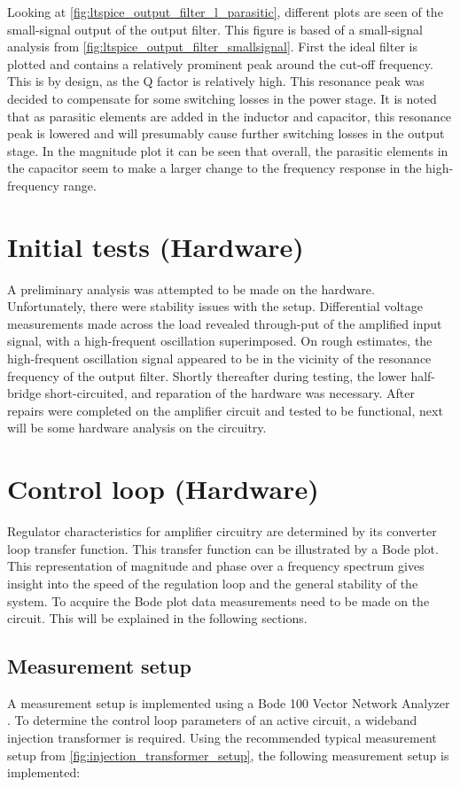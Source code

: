 Looking at \autoref{fig:ltspice_output_filter_l_parasitic}, different plots are seen of the small-signal output of the output filter. This figure is based of a small-signal analysis from \autoref{fig:ltspice_output_filter_smallsignal}. First the ideal filter is plotted and contains a relatively prominent peak around the cut-off frequency. This is by design, as the Q factor is relatively high. This resonance peak was decided to compensate for some switching losses in the power stage. It is noted that as parasitic elements are added in the inductor and capacitor, this resonance peak is lowered and will presumably cause further switching losses in the output stage. In the magnitude plot it can be seen that overall, the parasitic elements in the capacitor seem to make a larger change to the frequency response in the high-frequency range.

\section{Initial tests (Hardware)}
A preliminary analysis was attempted to be made on the hardware. Unfortunately, there were stability issues with the setup. Differential voltage measurements made across the load revealed through-put of the amplified input signal, with a high-frequent oscillation superimposed. On rough estimates, the high-frequent oscillation signal appeared to be in the vicinity of the resonance frequency of the output filter. Shortly thereafter during testing, the lower half-bridge short-circuited, and reparation of the hardware was necessary. After repairs were completed on the amplifier circuit and tested to be functional, next will be some hardware analysis on the circuitry.

\section{Control loop (Hardware)}
Regulator characteristics for amplifier circuitry are determined by its converter loop transfer function. This transfer function can be illustrated by a Bode plot. This representation of magnitude and phase over a frequency spectrum gives insight into the speed of the regulation loop and the general stability of the system. To acquire the Bode plot data measurements need to be made on the circuit. This will be explained in the following sections.

\subsection{Measurement setup}
A measurement setup is implemented using a Bode 100 Vector Network Analyzer \cite{bode100_manual}. To determine the control loop parameters of an active circuit, a wideband injection transformer is required. Using the recommended typical measurement setup from \autoref{fig:injection_transformer_setup}, the following measurement setup is implemented:

